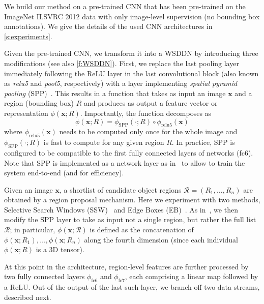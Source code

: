 \documentclass[10pt,twocolumn,letterpaper]{article}
\newcommand{\bx}{\mathbf{x}}
\begin{document}
We build our method on a pre-trained CNN that has been pre-trained on the ImageNet ILSVRC 2012 data \cite{Russakovsky15} with only image-level supervision (\ie no bounding box annotations). We give the details of the used CNN architectures in \cref{s:experiments}. 

Given the pre-trained CNN, we transform it into a WSDDN by introducing three modifications (see also \cref{f:WSDDN}). First, we replace the last pooling layer immediately following the ReLU layer in the last convolutional block (also known as \textit{relu5} and \textit{pool5}, respectively) with a layer implementing \emph{spatial pyramid pooling} (SPP)~\cite{Lazebnik06,He14}. This results in a function that takes as input an image $\bx$ and a region (bounding box) $R$ and produces as output a feature vector or representation $\phi(\bx;R)$. Importantly, the function decomposes as
\[
\phi(\bx;R) = \phi_{\text{SPP}}(\cdot ; R) \circ \phi_{\text{relu5}}(\bx)
\]
where $\phi_{\text{relu5}}(\bx)$ needs to be computed only once for the whole image and $\phi_{\text{SPP}}(\cdot ; R)$ is fast to compute for any given region $R$. In practice, SPP is configured to be compatible to the first fully connected layers of networks (\ie fc6). Note that SPP is implemented as a network layer as in~\cite{Girshick15} to allow to train the system end-to-end (and for efficiency).

Given an image $\bx$, a shortlist of candidate object regions $\mathcal{R} = (R_1,\dots,R_n)$ are obtained by a region proposal mechanism. Here we experiment with two methods, Selective Search Windows (SSW)~\cite{Sande11} and Edge Boxes (EB)~\cite{Zitnick14}. As in~\cite{Girshick15}, we then modify the SPP layer to take as input not a single region, but rather the full list $\mathcal{R}$; in particular, $\phi(\bx;\mathcal{R})$ is defined as the concatenation of $\phi(\bx;R_1), \dots, \phi(\bx;R_n)$ along the fourth dimension (since each individual $\phi(\bx;R)$ is a 3D tensor).

At this point in the architecture, region-level features are further processed by two fully connected layers $\phi_\text{fc6}$ and $\phi_\text{fc7}$, each comprising a linear map followed by a ReLU. Out of the output of the last such layer, we branch off two data streams, described next.
\end{document}
